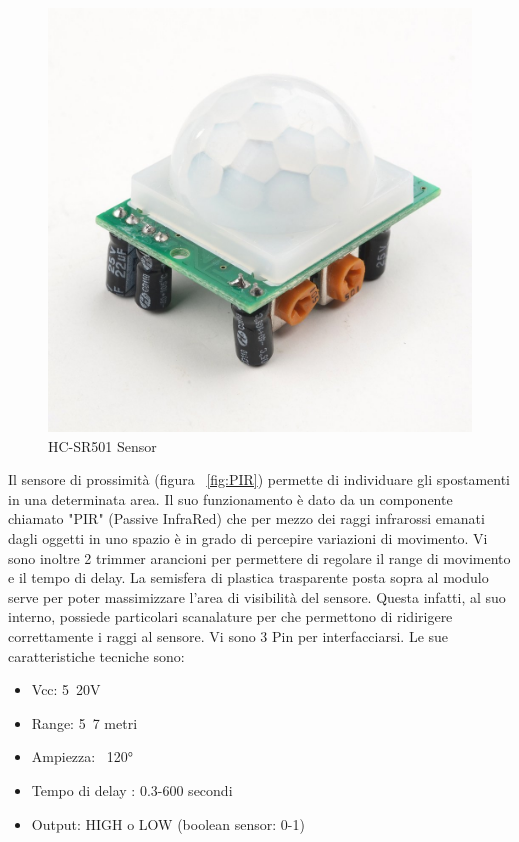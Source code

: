 \newpage
  
\begin{figure}
	\centering
	\includegraphics[width=0.7\linewidth]{Figures/Sensors&Rasp/pir}
	\caption[PIR] {HC-SR501 Sensor}
	\label{fig:pir}
\end{figure}


  Il sensore di prossimità (figura ~\ref{fig:PIR}) permette di individuare gli spostamenti in una determinata area. Il suo funzionamento è dato da un componente chiamato "PIR" (Passive InfraRed) che per mezzo dei raggi infrarossi emanati dagli oggetti in uno spazio è in grado di percepire variazioni di movimento. Vi sono inoltre 2 trimmer arancioni per permettere di regolare il range di movimento e il tempo di delay. La semisfera di plastica trasparente posta sopra al modulo serve per poter massimizzare l'area di visibilità del sensore. Questa infatti, al suo interno, possiede particolari scanalature per che permettono di ridirigere correttamente i raggi al sensore. Vi sono 3 Pin per interfacciarsi.
Le sue caratteristiche tecniche sono:

 \begin{itemize}
 	\item Vcc: 5~20V
 	\item Range: 5~7 metri
 	\item Ampiezza: ~120°
 	\item Tempo di delay : 0.3-600 secondi
 	\item Output: HIGH o LOW (boolean sensor: 0-1)
 \end{itemize}




